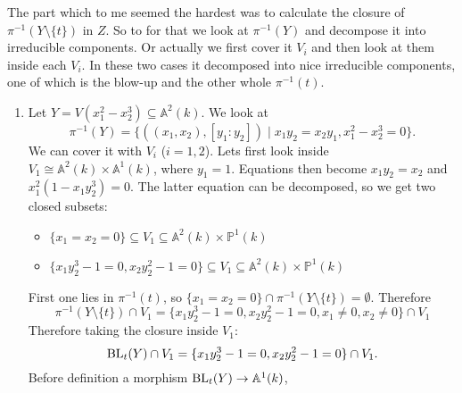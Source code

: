 \begin{exercise}{2}
    The part which to me seemed the hardest was to calculate the closure of
    $\pi^{-1}(Y \setminus \{t\})$ in $Z$. So to for that we look at
    $\pi^{-1}(Y)$ and decompose it into irreducible components. Or actually we
    first cover it $V_i$ and then look at them inside each $V_i$. In these two
    cases it decomposed into nice irreducible components, one of which is the
    blow-up and the other whole $\pi^{-1}(t)$.
    \begin{enumerate}
        \item{Let $Y = V(x^2_1 - x^3_2) \subseteq \mathbb{A}^2(k)$. We look at
            \begin{equation}
                \pi^{-1}(Y) = \{ ((x_1, x_2), [y_1 : y_2]) \mid x_1 y_2 = x_2
                y_1, x^2_1 - x^3_2 = 0 \}.
            \end{equation}
            We can cover it with $V_i$ ($i=1,2$). Lets first look inside $V_1
            \cong \mathbb{A}^2(k) \times \mathbb{A}^1(k)$, where $y_1 = 1$.
            Equations then become $x_1 y_2 = x_2$ and $x^2_1 (1 - x_1
            y^3_2) = 0$. The latter equation can be decomposed, so we get two
            closed subsets:
            \begin{itemize}
                \item{
                        $\{ x_1 = x_2 = 0 \} \subseteq
                        V_1 \subseteq \mathbb{A}^2(k) \times \mathbb{P}^1(k)$
                    }
                \item{
                        $\{ x_1 y^3_2 - 1 = 0, x_2 y^2_2 - 1 = 0 \} \subseteq
                        V_1 \subseteq \mathbb{A}^2(k) \times \mathbb{P}^1(k)$
                    }
            \end{itemize}
            First one lies in $\pi^{-1}(t)$, so $\{ x_1 = x_2 = 0 \} \cap
            \pi^{-1}(Y \setminus \{t\}) = \emptyset$. Therefore
            \begin{equation}
                \pi^{-1}(Y \setminus \{t\}) \cap V_1 = \{ x_1 y^3_2 - 1 = 0, x_2
                y^2_2 - 1 = 0, x_1 \not= 0, x_2 \not= 0 \} \cap V_1
            \end{equation}
            Therefore taking the closure inside $V_1$:
            \begin{equation}
                \operatorname{BL}_t(Y) \cap V_1 = \{ x_1 y^3_2 - 1 = 0, x_2 y^2_2 - 1 = 0 \}
                \cap V_1.
            \end{equation}
            Before definition a morphism $\operatorname{BL}_t(Y) \rightarrow \mathbb{A}^1(k)$,
}
\end{enumerate}
\end{exercise}

